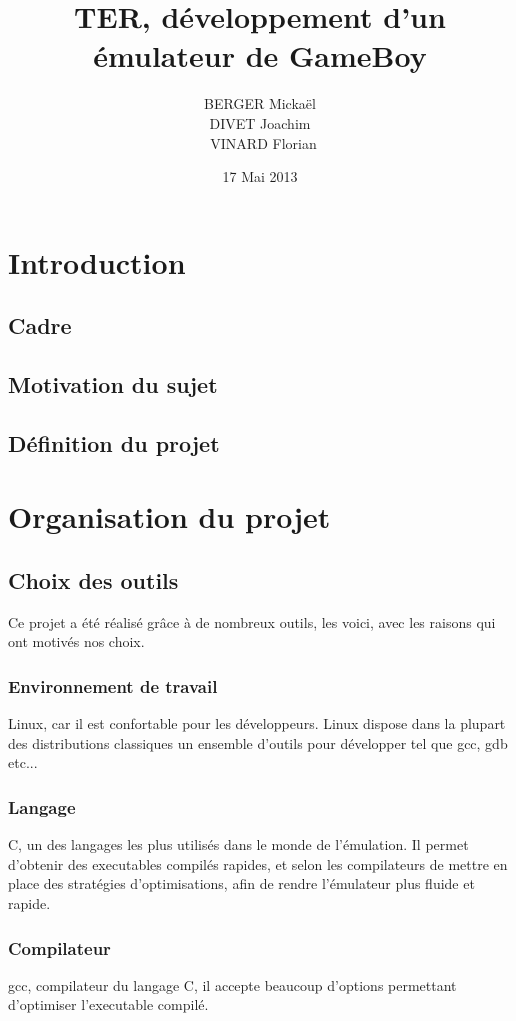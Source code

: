 \documentclass{report}
\title{TER, développement d'un émulateur de GameBoy}
\author{BERGER Mickaël \\ DIVET Joachim \\ VINARD Florian}
\date{17 Mai 2013}
\begin{document}
\maketitle

\tableofcontents
\chapter{Introduction}
\section{Cadre}
\section{Motivation du sujet}
\section{Définition du projet}

\chapter{Organisation du projet}
\section{Choix des outils}
Ce projet a été réalisé grâce à de nombreux outils, les voici, avec les raisons qui ont motivés nos choix.\\

\subsection{Environnement de travail}
Linux, car il est confortable pour les développeurs. Linux dispose dans la plupart des distributions classiques un ensemble d'outils pour développer tel que gcc, gdb etc...

\subsection{Langage}
C, un des langages les plus utilisés dans le monde de l'émulation. Il permet d'obtenir des executables compilés rapides, et selon les compilateurs de mettre en place des stratégies d'optimisations, afin de rendre l'émulateur plus fluide et rapide.

\subsection{Compilateur}
gcc, compilateur du langage C, il accepte beaucoup d'options permettant d'optimiser l'executable compilé.
\end{document}
